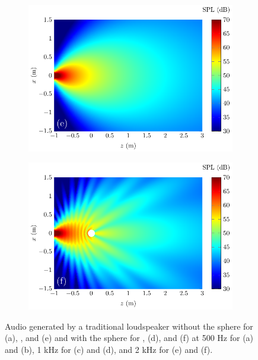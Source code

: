 \begin{figure}[!htb]
\begin{subfigure}{0.49\textwidth}
        \includegraphics[width = \textwidth]{fig/CircPiston_NoSphere_2D_2000Hz_210718D_211211P}
    \end{subfigure}
    \begin{subfigure}{0.49\textwidth}
        \centering
        \includegraphics[width = \textwidth]{fig/CircPiston_Sphere_2D_2000Hz_210718D_211211Q}
    \end{subfigure}
    \caption{Audio  generated by a traditional loudspeaker without the sphere for (a), , and (e) and with the sphere for , (d), and (f) at 500 Hz for (a) and (b), 1 kHz for (c) and (d), and 2 kHz for (e) and (f).}
    \label{fig:scat_result_traditional}
\end{figure}

